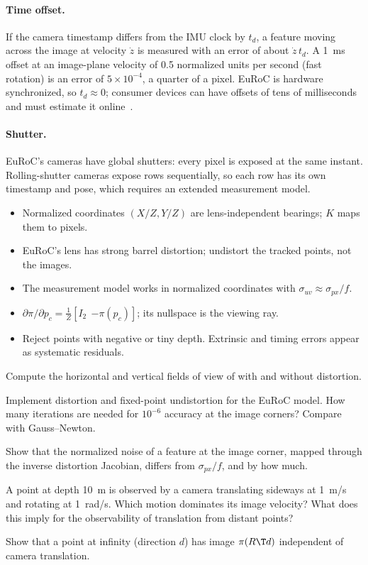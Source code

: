 \paragraph{Time offset.} If the camera timestamp differs from the IMU clock by $t_d$, a feature moving across the image at
velocity $\dot z$ is measured with an error of about $\dot z\,t_d$. A 1~ms offset at an image-plane velocity of 0.5 normalized
units per second (fast rotation) is an error of $5\times10^{-4}$, a quarter of a pixel. EuRoC is hardware synchronized, so
$t_d \approx 0$; consumer devices can have offsets of tens of milliseconds and must estimate it
online~\cite{li2014timeoffset}.

\paragraph{Shutter.} EuRoC's cameras have global shutters: every pixel is exposed at the same instant. Rolling-shutter
cameras expose rows sequentially, so each row has its own timestamp and pose, which requires an extended measurement
model.

\begin{takeaways}
\begin{itemize}
  \item Normalized coordinates $(X/Z, Y/Z)$ are lens-independent bearings; $K$ maps them to pixels.
  \item EuRoC's lens has strong barrel distortion; undistort the tracked points, not the images.
  \item The measurement model works in normalized coordinates with $\sigma_{uv} \approx \sigma_{px}/f$.
  \item $\partial\pi/\partial p_c = \frac1Z[I_2\ \ {-\pi(p_c)}]$; its nullspace is the viewing ray.
  \item Reject points with negative or tiny depth. Extrinsic and timing errors appear as systematic residuals.
\end{itemize}
\end{takeaways}

\begin{exercises}
  \item Compute the horizontal and vertical fields of view of  with and without distortion.
  \item Implement distortion and fixed-point undistortion for the EuRoC model. How many iterations are needed for
        $10^{-6}$ accuracy at the image corners? Compare with Gauss--Newton.
  \item Show that the normalized noise of a feature at the image corner, mapped through the inverse distortion
        Jacobian, differs from $\sigma_{px}/f$, and by how much.
  \item A point at depth 10~m is observed by a camera translating sideways at 1~m/s and rotating at 1~rad/s. Which motion
        dominates its image velocity? What does this imply for the observability of translation from distant points?
  \item Show that a point at infinity (direction $d$) has image $\pi(R\T d)$ independent of camera translation.
\end{exercises}
